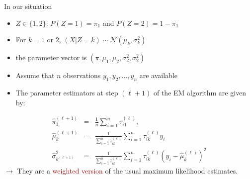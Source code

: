 \documentclass{beamer}\usepackage[]{graphicx}\usepackage[]{color}
\newcommand{\emphase}[1]{\textcolor{darkred}{#1}}
\newcommand{\Ncal}{\mathcal{N}}
\begin{document}
\begin{frame}{In our situation}
\begin{itemize}  
\item $Z \in \{1,2\}$: $P(Z=1)=\pi_1$ and $P(Z=2)=1-\pi_1$  
\item For $k=1$ or $2$, $(X|Z=k) \sim \Ncal(\mu_k, \sigma_k^2)$ 
\item the parameter vector is $(\pi, \mu_1, \mu_2, \sigma_2^2, \sigma_2^2)$
\item[] Assume that $n$ observations $y_1, y_2, ..., y_n$ are available
\item The parameter estimators  at step $(\ell+1)$ of the EM algorithm 
are given by:
\end{itemize}
\bigskip
   \begin{eqnarray*}
     \widehat{\pi}_1^{(\ell+1)} & = & \frac1{n} \sum_{i=1}^n \tau_{i1} ^{(\ell)}, \\
     \widehat{\mu}_k^{(\ell+1)} & = & \frac1{\sum_{i=1}^n  \tau_{ik} ^{(\ell)}} \sum_{i=1}^n \tau_{ik}^{(\ell)} y_i \\ 
     \widehat{\sigma}^2_{k^{(\ell+1)}} & = &  \frac1{\sum_{i=1}^n  \tau_{ik} ^{(\ell)}} \sum_{i=1}^n \tau_{ik}^{(\ell)} (y_i - \widehat{\mu}_k^{(\ell)})^2
  \end{eqnarray*}
   $\rightarrow$ They are a \emphase{weighted version} of the usual maximum
   likelihood estimates. 
\end{frame}
\end{document}
